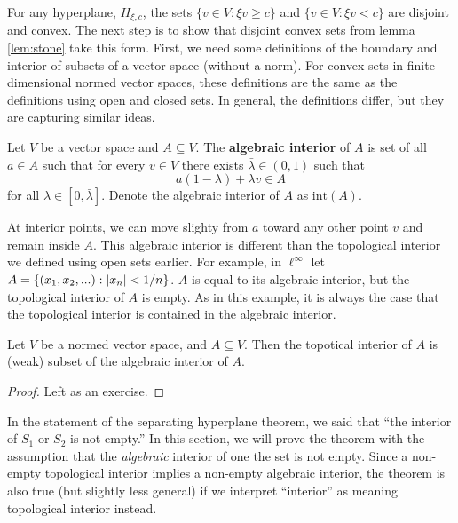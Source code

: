 For any hyperplane, $H_{\xi,c}$, the sets $\{v \in V: \xi v \geq c\}$
and $\{v \in V: \xi v < c\}$ are disjoint and convex. The next step is
to show that disjoint convex sets from lemma \ref{lem:stone} take this
form. First, we need some definitions of the boundary and interior of
subsets of a vector space (without a norm). For convex sets in finite
dimensional normed vector spaces, these definitions are the same as
the definitions using open and closed sets. In general, the
definitions differ, but they are capturing similar ideas. 
\begin{definition}
  Let $V$ be a vector space and $A \subseteq V$. The \textbf{algebraic
    interior} of $A$ is set of all $a \in A$ such that for every $v
  \in V$ there exists $\bar{\lambda} \in (0,1)$ such that 
  \[ a(1-\lambda) + \lambda v \in A \]
  for all $\lambda \in [0,\bar{\lambda}]$. Denote the algebraic
  interior of $A$ as $\mathrm{int}(A)$.
\end{definition}
At interior points, we can move slighty from $a$ toward any other
point $v$ and remain inside $A$. This algebraic interior is different
than the topological interior we defined using open sets earlier. For
example, in $\ell^\infty$ let $A = \{(x_1, x_2, ...) : \left\vert {x_n} \right\vert <
1/n \}$. $A$ is equal to its algebraic interior, but the topological
interior of $A$ is empty. As in this example, it is always the case
that the topological interior is contained in the algebraic interior.
\begin{lemma}
  Let $V$ be a normed vector space, and $A \subseteq V$. Then the
  topotical interior of $A$ is (weak) subset of the algebraic interior
  of $A$.
\end{lemma}
\begin{proof}
  Left as an exercise.
\end{proof}
In the statement of the separating hyperplane theorem, we said that
``the interior of $S_1$ or $S_2$ is not empty.'' In this section, we
will prove the theorem with the assumption that the \emph{algebraic}
interior of one the set is not empty. Since a non-empty topological
interior implies a non-empty algebraic interior, the theorem is also
true (but slightly less general) if we interpret ``interior'' as meaning
topological interior instead.

